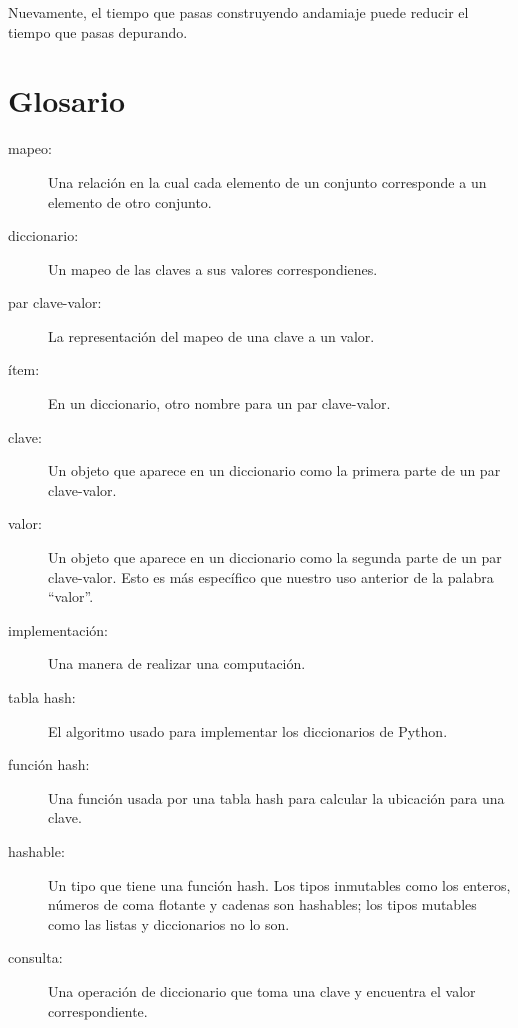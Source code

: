 \documentclass[10pt]{book}
\begin{document}
Nuevamente, el tiempo que pasas construyendo andamiaje puede reducir
el tiempo que pasas depurando.


\section{Glosario}

\begin{description}

\item[mapeo:] Una relación en la cual cada elemento de un conjunto
corresponde a un elemento de otro conjunto.

\item[diccionario:] Un mapeo de las claves a sus
valores correspondienes.

\item[par clave-valor:] La representación del mapeo de
una clave a un valor.

\item[ítem:] En un diccionario, otro nombre para un par
clave-valor.

\item[clave:] Un objeto que aparece en un diccionario como la
primera parte de un par clave-valor.

\item[valor:] Un objeto que aparece en un diccionario como la
segunda parte de un par clave-valor.  Esto es más específico que
nuestro uso anterior de la palabra ``valor''.

\item[implementación:] Una manera de realizar una computación.

\item[tabla hash:] El algoritmo usado para implementar los
diccionarios de Python.

\item[función hash:] Una función usada por una tabla hash para calcular
la ubicación para una clave.

\item[hashable:] Un tipo que tiene una función hash.  Los tipos inmutables
como los enteros, números de
coma flotante y cadenas son hashables; los tipos mutables como las listas y
diccionarios no lo son.

\item[consulta:] Una operación de diccionario que toma una clave y encuentra
el valor correspondiente.


\end{description}
\end{document}

